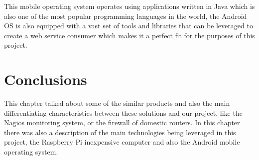 This mobile operating system operates using applications written in Java which
is also one of the most popular programming languages in the world, the Android
OS is also equipped with a vast set of tools and libraries that can be leveraged
to create a web service consumer which makes it a perfect fit for the purposes
of this project.


\section{Conclusions}
\label{chap2:sec:concs}
This chapter talked about some of the similar products and also the main
differentiating characteristics between these solutions and our project, like
the Nagios monitoring system, or the firewall of domestic routers.
In this chapter there was also a description of the main technologies being
leveraged in this project, the Raspberry Pi inexpensive computer and also the
Android mobile operating system.

